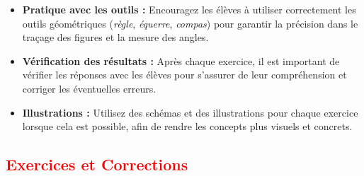 \documentclass{article}
\begin{document}
\begin{tcolorbox}[colback=pink!10!white, colframe=pink!75!black, title=\textcolor{white}{Conseils Pédagogiques}, sharp corners=south]
    
    \begin{itemize}
        \item \textbf{Pratique avec les outils :} Encouragez les élèves à utiliser correctement les outils géométriques (\textit{règle}, \textit{équerre}, \textit{compas}) pour garantir la précision dans le traçage des figures et la mesure des angles.
        
        \item \textbf{Vérification des résultats :} Après chaque exercice, il est important de vérifier les réponses avec les élèves pour s'assurer de leur compréhension et corriger les éventuelles erreurs.
        
        \item \textbf{Illustrations :} Utilisez des schémas et des illustrations pour chaque exercice lorsque cela est possible, afin de rendre les concepts plus visuels et concrets.
    \end{itemize}

\end{tcolorbox}


\subsection{\textcolor{red}{ Exercices et Corrections}}
\end{document}
